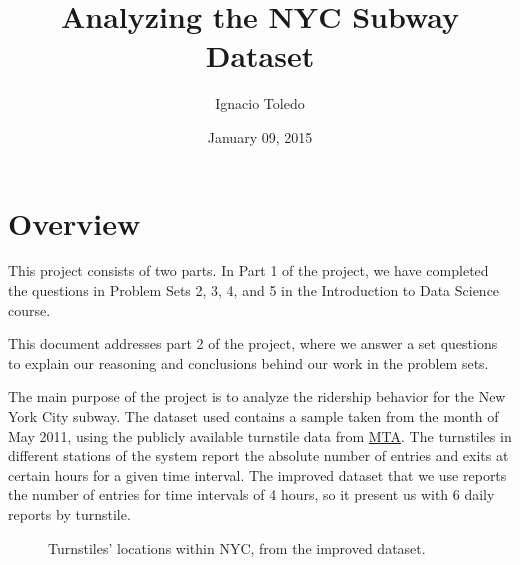 \documentclass[a4paper,12pt,english]{sphinxmanual}
\title{Analyzing the NYC Subway Dataset}
\date{January 09, 2015}
\author{Ignacio Toledo}
\begin{document}
\maketitle
\tableofcontents
{}\label{index::doc}



\chapter{Overview}
\label{overview:overview}\label{overview::doc}\label{overview:analyzing-the-nyc-subway-dataset}
This project consists of two parts. In Part 1 of the project, we have completed
the questions in Problem Sets 2, 3, 4, and 5 in the Introduction to
Data Science course.

This document addresses part 2 of the project, where we answer a set questions
to explain our reasoning and conclusions behind our work in the problem sets.

The main purpose of the project is to analyze the ridership behavior for the
New York City subway. The dataset used contains a sample taken from the month
of May 2011, using the publicly available turnstile data from
\href{http://web.mta.info/developers/turnstile.html}{MTA}. The turnstiles in
different stations of the system report the absolute number of entries and exits
at certain hours for a given time interval. The improved dataset that we use
reports the number of entries for time intervals of 4 hours, so it present us
with 6 daily reports by turnstile.
\begin{figure}[htbp]
\centering
\capstart

\caption{Turnstiles' locations within NYC, from the improved dataset.}\end{figure}
\end{document}
